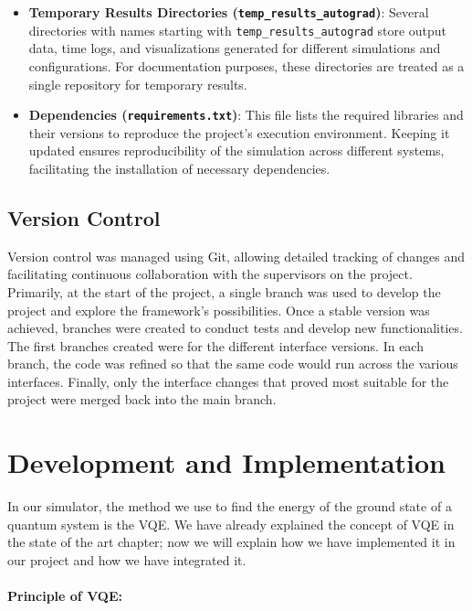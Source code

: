 \begin{itemize}
    \item \textbf{Temporary Results Directories (\texttt{temp\_results\_autograd})}:  
    Several directories with names starting with \texttt{temp\_results\_autograd} store output data, time logs, and visualizations generated for different simulations and configurations. For documentation purposes, these directories are treated as a single repository for temporary results.

    \item \textbf{Dependencies (\texttt{requirements.txt})}:  
    This file lists the required libraries and their versions to reproduce the project's execution environment. Keeping it updated ensures reproducibility of the simulation across different systems, facilitating the installation of necessary dependencies.
\end{itemize}


\subsection{Version Control}

Version control was managed using Git, allowing detailed tracking of changes and facilitating continuous collaboration with the supervisors on the project. Primarily, at the start of the project, a single branch was used to develop the project and explore the framework's possibilities. Once a stable version was achieved, branches were created to conduct tests and develop new functionalities. The first branches created were for the different interface versions. In each branch, the code was refined so that the same code would run across the various interfaces. Finally, only the interface changes that proved most suitable for the project were merged back into the main branch.

\section{Development and Implementation}

In our simulator, the method we use to find the energy of the ground state of a quantum system is the VQE. We have already explained the concept of VQE in the state of the art chapter; now we will explain how we have implemented it in our project and how we have integrated it.

\paragraph{Principle of VQE:}

